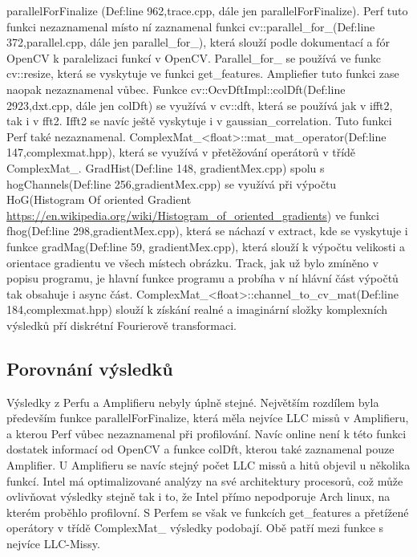 \documentclass{article}
\begin{document}
parallelForFinalize (Def:line 962,trace.cpp, dále jen parallelForFinalize). Perf tuto funkci nezaznamenal místo ní zaznamenal funkci cv::parallel\_for\_(Def:line 372,parallel.cpp, dále jen parallel\_for\_), která slouží podle dokumentací a fór OpenCV k paralelizaci funkcí v OpenCV. Parallel\_for\_ se používá ve funkc cv::resize, která se vyskytuje ve funkci get\_features. Ampliefier tuto funkci zase naopak nezaznamenal vůbec. Funkce cv::OcvDftImpl::colDft(Def:line 2923,dxt.cpp, dále jen colDft) se využívá v cv::dft, která se používá jak v ifft2, tak i v fft2. Ifft2 se navíc ještě vyskytuje i v gaussian\_correlation. Tuto funkci Perf také nezaznamenal. ComplexMat\_<float>::mat\_mat\_operator(Def:line 147,complexmat.hpp), která se využívá v přetěžování operátorů v třídě ComplexMat\_. GradHist(Def:line 148, gradientMex.cpp) spolu s hogChannels(Def:line 256,gradientMex.cpp) se využívá při výpočtu HoG(Histogram Of oriented Gradient \url{https://en.wikipedia.org/wiki/Histogram_of_oriented_gradients}) ve funkci fhog(Def:line 298,gradientMex.cpp), která se náchazí v extract, kde se vyskytuje i funkce gradMag(Def:line 59, gradientMex.cpp), která slouží k výpočtu velikosti a orientace gradientu ve všech místech obrázku. Track, jak už bylo zmíněno v popisu programu, je hlavní funkce programu a probíha v ní hlávní část výpočtů tak obsahuje i async část.  ComplexMat\_<float>::channel\_to\_cv\_mat(Def:line 184,complexmat.hpp) slouží k získání realné a imaginární složky komplexních výsledků pří diskrétní Fourierově transformaci.
\subsection{Porovnání výsledků}
Výsledky z Perfu a Amplifieru nebyly úplně stejné. Největším rozdílem byla především funkce parallelForFinalize, která měla nejvíce LLC missů v Amplifieru, a kterou Perf vůbec nezaznamenal při profilování. Navíc online není k této funkci dostatek informací od OpenCV a funkce colDft, kterou také zaznamenal pouze Amplifier. U Amplifieru se navíc stejný počet LLC missů a hitů objevil u několika funkcí. Intel má optimalizované analýzy na své architektury procesorů, což může ovlivňovat výsledky stejně tak i to, že Intel přímo nepodporuje Arch linux, na kterém proběhlo profilovní. S Perfem se však ve funkcích get\_features a přetížené operátory v třídě ComplexMat\_ výsledky podobají. Obě patří mezi funkce s nejvíce LLC-Missy.
\end{document}
